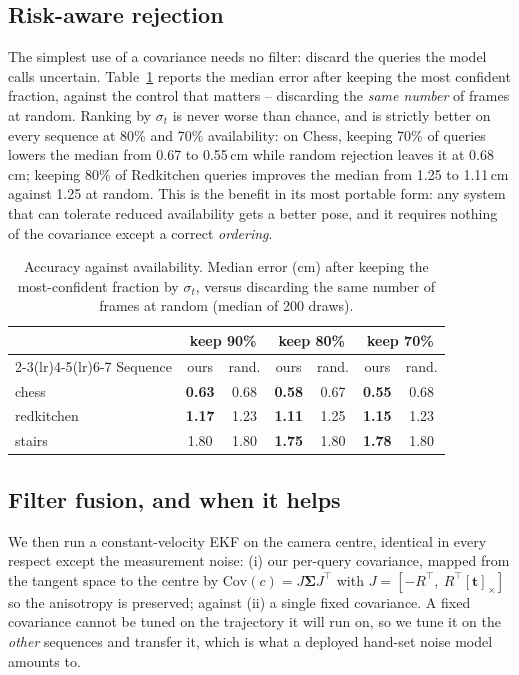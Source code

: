 \documentclass[journal]{IEEEtran}
\begin{document}
\subsection{Risk-aware rejection}
The simplest use of a covariance needs no filter: discard the queries the
model calls uncertain. Table~\ref{tab:reject} reports the median error after
keeping the most confident fraction, against the control that matters --
discarding the \emph{same number} of frames at random. Ranking by $\sigma_t$ is never worse than chance, and is strictly better on every sequence at 80\% and 70\% availability: on Chess, keeping 70\%
of queries lowers the median from 0.67 to 0.55\,cm while random rejection
leaves it at 0.68\,cm; keeping 80\% of Redkitchen queries improves the median from 1.25 to 1.11\,cm against 1.25 at random. This is the benefit in its most portable form: any system that can
tolerate reduced availability gets a better pose, and it requires nothing of
the covariance except a correct \emph{ordering}.

\begin{table}[t]
\caption{Accuracy against availability. Median error (cm) after keeping the
most-confident fraction by $\sigma_t$, versus discarding the same number of
frames at random (median of 200 draws).}
\label{tab:reject}
\centering\footnotesize
\setlength{\tabcolsep}{4pt}
\begin{tabular}{@{}lcccccc@{}}
\toprule
& \multicolumn{2}{c}{keep 90\%} & \multicolumn{2}{c}{keep 80\%} & \multicolumn{2}{c}{keep 70\%} \\
\cmidrule(lr){2-3}\cmidrule(lr){4-5}\cmidrule(lr){6-7}
Sequence & ours & rand. & ours & rand. & ours & rand. \\
\midrule
chess      & \textbf{0.63} & 0.68 & \textbf{0.58} & 0.67 & \textbf{0.55} & 0.68 \\
redkitchen & \textbf{1.17} & 1.23 & \textbf{1.11} & 1.25 & \textbf{1.15} & 1.23 \\
stairs     & 1.80 & 1.80 & \textbf{1.75} & 1.80 & \textbf{1.78} & 1.80 \\
\bottomrule
\end{tabular}
\end{table}

\subsection{Filter fusion, and when it helps}
We then run a constant-velocity EKF on the camera centre, identical in every
respect except the measurement noise: (i) our per-query covariance, mapped
from the tangent space to the centre by
$\mathrm{Cov}(c)=J\bm\Sigma J^\top$ with $J=[-R^\top,\ R^\top[\mathbf{t}]_\times]$
so the anisotropy is preserved; against (ii) a single fixed covariance. A
fixed covariance cannot be tuned on the trajectory it will run on, so we tune
it on the \emph{other} sequences and transfer it, which is what a deployed
hand-set noise model amounts to.
\end{document}
